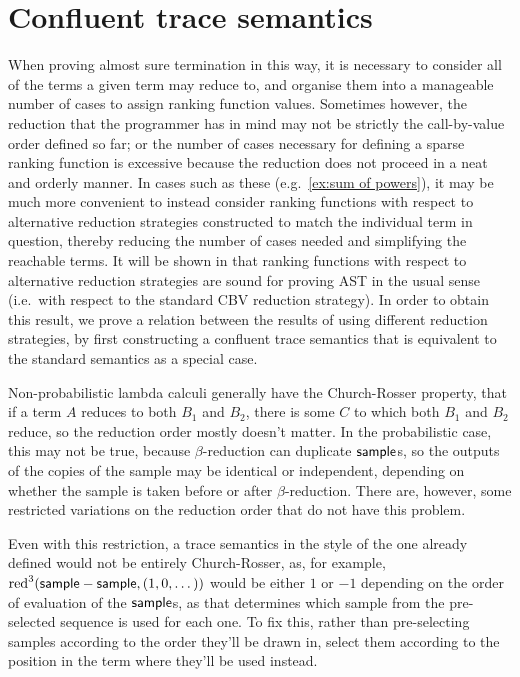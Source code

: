 \section{Confluent trace semantics}
\label{sec:confluent}

When proving almost sure termination in this way, it is necessary to consider all of the terms a given term may reduce to, and organise them into a manageable number of cases to assign ranking function values. 
Sometimes however, the reduction that the programmer has in mind may not be strictly the call-by-value order defined so far; 
or the number of cases necessary for defining a sparse ranking function is excessive because the reduction does not proceed in a neat and orderly manner. 
In cases such as these (e.g.~\cref{ex:sum of powers}), it may be much more convenient to instead consider ranking functions with respect to alternative reduction strategies constructed to match the individual term in question, 
thereby reducing the number of cases needed and simplifying the reachable terms. 
It will be shown in  that ranking functions with respect to alternative reduction strategies are sound for proving AST in the usual sense (i.e.~with respect to the standard CBV reduction strategy). 
In order to obtain this result, we prove a relation between the results of using different reduction strategies, 
by first constructing a confluent trace semantics that is equivalent to the standard semantics as a special case.

Non-probabilistic lambda calculi generally have the Church-Rosser property, that if a term $A$ reduces to both $B_1$ and $B_2$, there is some $C$ 
to which both $B_1$ and $B_2$ reduce,
so the reduction order mostly doesn't matter. 
In the probabilistic case, this may not be true, because $\beta$-reduction can duplicate $\mathsf{sample}$s, so the outputs of the copies of the sample may be identical or independent, depending on whether the sample is taken before or after $\beta$-reduction. 
There are, however, some restricted variations on the reduction order that do not have this problem.

\medskip
Even with this restriction, a trace semantics in the style of the one already defined would not be entirely Church-Rosser, as, for example, $\operatorname{red}^3(\mathsf{sample} - \mathsf{sample}, (1,0,\dots))$ would be either $1$ or $-1$ depending on the order of evaluation of the $\mathsf{sample}$s, as that determines which sample from the pre-selected sequence is used for each one. To fix this, rather than pre-selecting samples according to the order they'll be drawn in, select them according to the position in the term where they'll be used instead.

